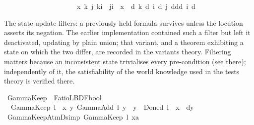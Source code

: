 \begin{isabellebody}
\ \ \ \ \ \ \ \ \ \ \ \ \ \ \ \ \ \ {\isacharbar}{\kern0pt}\ {\isasymominus}\ {\isasymRightarrow}\ {\isacharparenleft}{\kern0pt}{\isasymlambda}x{\isachardot}{\kern0pt}\ {\isasymexists}k\ j{\isachardot}{\kern0pt}\ k{\isasymnoteq}i\ {\isasymand}\ j{\isasymnoteq}i\ {\isasymand}\ x\ {\isacharequal}{\kern0pt}\ {\isasymB}\isactrlsup d\ k\ {\isacharparenleft}{\kern0pt}{\isasymD}\isactrlsup d\ i\ {\isacharparenleft}{\kern0pt}{\isasymB}\isactrlsup d\ j\ {\isacharparenleft}{\kern0pt}{\isasymnot}\isactrlsup d{\isasymnot}\isactrlsup d{\isacharparenleft}{\kern0pt}{\isasymB}\isactrlsup d\ i\ {\isacharbraceleft}{\kern0pt}{\isasymphi}{\isacharbraceright}{\kern0pt}\isactrlsup d{\isacharparenright}{\kern0pt}{\isacharparenright}{\kern0pt}{\isacharparenright}{\kern0pt}{\isacharparenright}{\kern0pt}{\isacharparenright}{\kern0pt}{\isacharparenright}{\kern0pt}{\isachardoublequoteclose}%
\begin{isamarkuptext}%
The state update filters: a previously held formula survives unless the
locution asserts its negation. The earlier implementation contained such a filter
but left it deactivated, updating by plain union; that variant, and a theorem
exhibiting a state on which the two differ, are recorded in the variants theory.
Filtering matters because an inconsistent state trivialises every pre-condition
(see  there); independently of it, the satisfiability of the
world knowledge used in the tests theory is verified there.%
\end{isamarkuptext}\isamarkuptrue%
\isamarkupfalse%
\ GammaKeep\ {\isacharcolon}{\kern0pt}{\isacharcolon}{\kern0pt}\ {\isachardoublequoteopen}FatioL{\isasymRightarrow}{\isacharparenleft}{\kern0pt}BDF{\isasymRightarrow}bool{\isacharparenright}{\kern0pt}{\isachardoublequoteclose}\ \isanewline
\ \ {\isachardoublequoteopen}GammaKeep\ l\ {\isasymequiv}\ {\isasymlambda}x{\isachardot}{\kern0pt}\ {\isasymnot}{\isacharparenleft}{\kern0pt}{\isasymexists}y{\isachardot}{\kern0pt}\ {\isacharparenleft}{\kern0pt}GammaAdd\ l\ y\ {\isasymor}\ y\ {\isacharequal}{\kern0pt}\ Done\isactrlsup d\ l{\isacharparenright}{\kern0pt}\ {\isasymand}\ x\ {\isacharequal}{\kern0pt}\ {\isasymnot}\isactrlsup dy{\isacharparenright}{\kern0pt}{\isachardoublequoteclose}\isanewline
\isanewline
%
\isanewline
{}\isamarkupfalse%
\ GammaKeep{\isacharunderscore}{\kern0pt}AtmD{\isacharbrackleft}{\kern0pt}simp{\isacharbrackright}{\kern0pt}{\isacharcolon}{\kern0pt}\ {\isachardoublequoteopen}GammaKeep\ l\ {\isacharparenleft}{\kern0pt}x\isactrlsup a{\isacharparenright}{\kern0pt}{\isachardoublequoteclose}%

\end{isabellebody}
